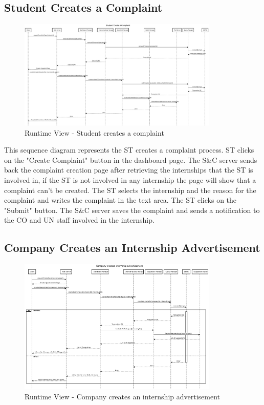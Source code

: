 \subsection{Student Creates a Complaint}
\label{sub:student-creates-a-complaint}%

\begin{figure}[H]
      \centering
      \includegraphics[width=0.85\textwidth]{Images/RV_05.pdf}
      \caption{Runtime View - Student creates a complaint}
      \label{fig:rv-student-creates-a-complaint}
\end{figure}

\par This sequence diagram represents the ST creates a complaint process. ST clicks on the "Create Complaint" button in the
dashboard page. The S\&C server sends back the complaint creation page after retrieving the internships that the ST is involved in,
if the ST is not involved in any internship the page will show that a complaint can't be created. The ST selects the internship
and the reason for the complaint and writes the complaint in the text area. The ST clicks on the "Submit" button. The S\&C server
saves the complaint and sends a notification to the CO and UN staff involved in the internship.

\subsection{Company Creates an Internship Advertisement}
\label{sub:company-creates-an-internship-advertisement}%

\begin{figure}[H]
      \centering
      \includegraphics[width=0.85\textwidth]{Images/RV_06.pdf}
      \caption{Runtime View - Company creates an internship advertisement}
      \label{fig:rv-company-creates-an-internship-advertisement}
\end{figure}

